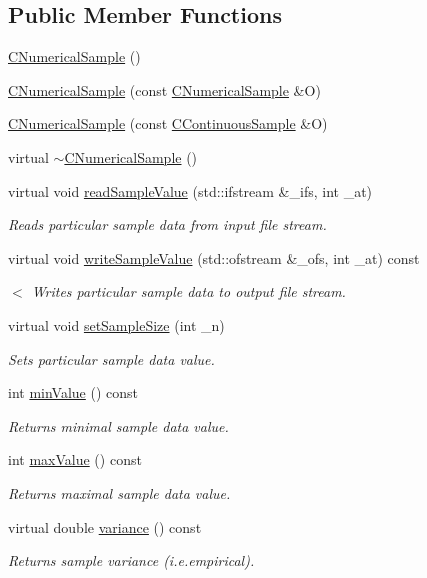 \subsection*{Public Member Functions}
\begin{DoxyCompactItemize}
\item 
\hyperlink{class_c_numerical_sample_a048b81156592132f06e23c4bcf1cd113}{C\-Numerical\-Sample} ()
\item 
\hyperlink{class_c_numerical_sample_ad63a5b9e8440a380a6daa5cdcdc1cd28}{C\-Numerical\-Sample} (const \hyperlink{class_c_numerical_sample}{C\-Numerical\-Sample} \&O)
\item 
\hyperlink{class_c_numerical_sample_accc910ec7b8abfaa9af11346f8bd8cb0}{C\-Numerical\-Sample} (const \hyperlink{class_c_continuous_sample}{C\-Continuous\-Sample} \&O)
\item 
virtual \hyperlink{class_c_numerical_sample_ae1d6f516e0122a2b257a036b1e42da1d}{$\sim$\-C\-Numerical\-Sample} ()
\item 
virtual void \hyperlink{class_c_numerical_sample_a929eddefbbb32c7079e2e60ca95535da}{read\-Sample\-Value} (std\-::ifstream \&\-\_\-ifs, int \-\_\-at)
\begin{DoxyCompactList}\small\item\em Reads particular sample data from input file stream. \end{DoxyCompactList}\item 
virtual void \hyperlink{class_c_numerical_sample_ae1ed83416fc77ab40019c2577047a788}{write\-Sample\-Value} (std\-::ofstream \&\-\_\-ofs, int \-\_\-at) const 
\begin{DoxyCompactList}\small\item\em $<$ Writes particular sample data to output file stream. \end{DoxyCompactList}\item 
virtual void \hyperlink{class_c_numerical_sample_a2a558ba5736bf8893121dd9174110140}{set\-Sample\-Size} (int \-\_\-n)
\begin{DoxyCompactList}\small\item\em Sets particular sample data value. \end{DoxyCompactList}\item 
int \hyperlink{class_c_numerical_sample_a23b6f5afff20a9bd788c49a557702d8c}{min\-Value} () const 
\begin{DoxyCompactList}\small\item\em Returns minimal sample data value. \end{DoxyCompactList}\item 
int \hyperlink{class_c_numerical_sample_ad207c9baed07803c1fb2ac5e285bd896}{max\-Value} () const 
\begin{DoxyCompactList}\small\item\em Returns maximal sample data value. \end{DoxyCompactList}\item 
virtual double \hyperlink{class_c_numerical_sample_aedf72750cb229d9c17417ba787e487f1}{variance} () const 
\begin{DoxyCompactList}\small\item\em Returns sample variance (i.\-e.\-empirical). \end{DoxyCompactList}\end{DoxyCompactItemize}
